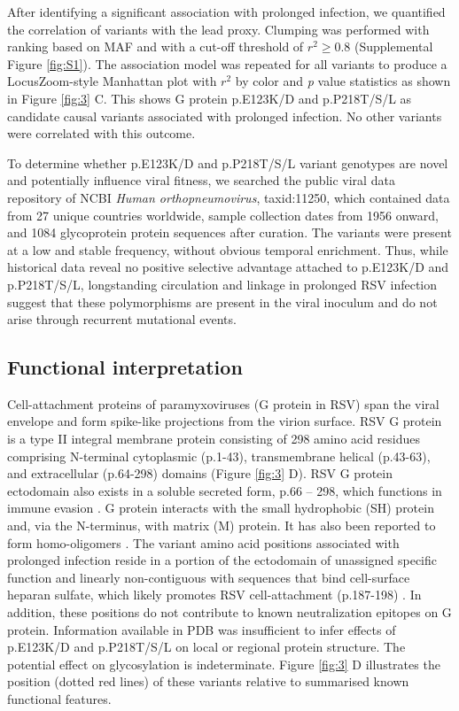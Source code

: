 \documentclass{article} %
\begin{document}
After identifying a significant association with prolonged infection,
we quantified the correlation of variants with the lead proxy.
Clumping was performed with ranking based on MAF and with a cut-off threshold of $r^2 \ge 0.8$ (Supplemental Figure \ref{fig:S1}).
The association model was repeated for all variants to produce a LocusZoom-style Manhattan plot with $r^2$ by color and \textit{p} value statistics as shown in 
Figure \ref{fig:3} C.
This shows G protein 
p.E123K/D and 
p.P218T/S/L as candidate causal variants associated with prolonged infection. 
No other variants were correlated with this outcome. 

To determine whether p.E123K/D and p.P218T/S/L variant genotypes are novel and potentially influence viral fitness, we searched  the public viral data repository of NCBI \textit{Human orthopneumovirus}, taxid:11250, which contained data from 
27 unique countries worldwide, sample collection dates from 1956 onward, and 1084 glycoprotein protein sequences after curation.
The variants were present at a low and stable frequency, without obvious temporal enrichment. 
Thus, while historical data reveal no positive selective advantage attached to p.E123K/D and p.P218T/S/L, longstanding circulation and linkage in prolonged RSV infection suggest that these polymorphisms are present in the viral inoculum and do not arise through recurrent mutational events.

\subsection{Functional interpretation}
Cell-attachment proteins of paramyxoviruses (G protein in RSV) span the viral envelope and form spike-like projections from the virion surface. 
RSV G protein is a type II integral membrane protein consisting of 298 amino acid residues comprising N-terminal cytoplasmic (p.1-43), transmembrane helical (p.43-63), and extracellular (p.64-298) domains 
(Figure \ref{fig:3} D). 
RSV G protein ectodomain also exists in a soluble secreted form, p.66 – 298, which functions in immune evasion 
\citep{levine1987demonstration, feldman1999identification, feldman2000fusion}.
G protein interacts with the small hydrophobic (SH) protein 
\citep{rixon2005respiratory}
and, via the N-terminus, with matrix (M) 
\citep{ghildyal2005interaction} 
protein.
It has also been reported to form homo-oligomers 
\citep{collins1992oligomerization}.
The variant amino acid positions associated with prolonged infection reside in a portion of the ectodomain of unassigned specific function and linearly non-contiguous with sequences that bind cell-surface heparan sulfate, which likely promotes RSV cell-attachment (p.187-198)
\citep{levine1987demonstration, feldman1999identification, feldman2000fusion}.
In addition, these positions do not contribute to known neutralization epitopes on G protein. Information available in PDB was insufficient to infer effects of p.E123K/D and p.P218T/S/L on local or regional protein structure. 
The potential effect on glycosylation is indeterminate. 
Figure \ref{fig:3} D illustrates the position (dotted red lines) of these variants relative to summarised known functional features.
\end{document}
